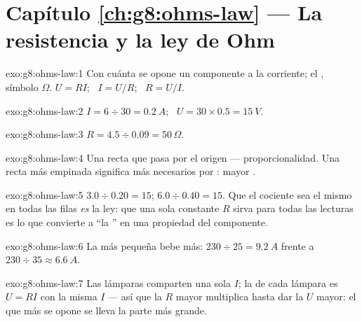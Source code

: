 \section*{Capítulo \ref{ch:g8:ohms-law} --- La resistencia y la ley de Ohm}

\begin{solution}{exo:g8:ohms-law:1}
Con cuánta  se opone un componente a la corriente;
 el , símbolo $\Omega$. $U = R I$; \ $I
= U/R$; \ $R = U/I$.
\end{solution}

\begin{solution}{exo:g8:ohms-law:2}
$I = 6 \div 30 = \qty{0.2}{A}$; \ $U = 30 \times 0.5 = \qty{15}{V}$.
\end{solution}

\begin{solution}{exo:g8:ohms-law:3}
$R = 4.5 \div 0.09 = 50\,\Omega$.
\end{solution}

\begin{solution}{exo:g8:ohms-law:4}
Una recta que pasa por el origen --- proporcionalidad. Una recta más
empinada significa más  necesarios por
: mayor .
\end{solution}

\begin{solution}{exo:g8:ohms-law:5}
$3.0 \div 0.20 = 15$; $6.0 \div 0.40 = 15$. Que el cociente sea el
mismo en todas las filas \emph{es} la ley: que una sola constante $R$
sirva para todas las lecturas es lo que convierte a ``la
'' en una propiedad del componente.
\end{solution}

\begin{solution}{exo:g8:ohms-law:6}
La  más pequeña bebe más: $230 \div 25 =
\qty{9.2}{A}$ frente a $230 \div 35 \approx \qty{6.6}{A}$.
\end{solution}

\begin{solution}{exo:g8:ohms-law:7}
Las lámparas  comparten una sola $I$; la  de cada
lámpara es $U = R I$ con la misma $I$ --- así que la $R$ mayor
multiplica hasta dar la $U$ mayor: el que más se opone se lleva la
parte más grande.
\end{solution}

